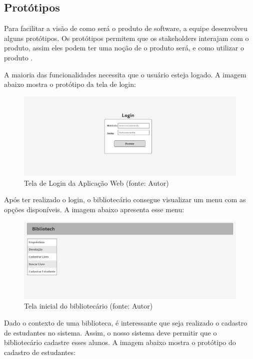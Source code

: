 \subsection[Protótipos]{Protótipos}
Para facilitar a visão de como será o produto de software, a equipe desenvolveu alguns protótipos. Os protótipos permitem que os stakeholders interajam com o produto, assim eles podem ter uma noção de o produto será, e como utilizar o produto \cite{preece2005}. 

A maioria das funcionalidades necessita que o usuário esteja logado. A imagem abaixo mostra o protótipo da tela de login: 

\begin{figure}[!h]
\centering
\includegraphics[scale=0.40, angle = 360]{figuras/prototipo1}
\caption[]{Tela de Login da Aplicação Web (fonte: Autor)}
\label{Tela de Login da Aplicação Web}
\end{figure}
\FloatBarrier

Após ter realizado o login, o bibliotecário consegue visualizar um menu com as opções disponíveis. A imagem abaixo apresenta esse menu:

\begin{figure}[!h]
\centering
\includegraphics[scale=0.40, angle = 360]{figuras/prototipo2}
\caption[]{Tela inicial do bibliotecário (fonte: Autor)}
\label{Tela inicial do bibliotecário}
\end{figure}
\FloatBarrier

Dado o contexto de uma biblioteca, é interessante que seja realizado o cadastro de estudantes no sistema. Assim, o nosso sistema deve permitir que o bibliotecário cadastre esses alunos. A imagem abaixo mostra o protótipo do cadastro de estudantes:

